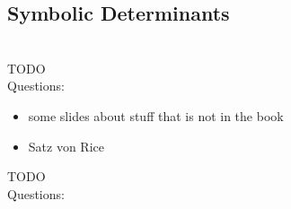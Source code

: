 \documentclass[a4]{scrartcl}
\begin{document}
















\subsection*{Symbolic Determinants}



\ \\

\color{red} TODO \\
\color{black}
\color{violet} Questions: \\
\color{black}






\begin{itemize}
\item some slides about stuff that is not in the book
\item Satz von Rice
\end{itemize}


\color{red} TODO \\
\color{black}
\color{violet} Questions: \\
\color{black}



\newpage

\printbibliography
\end{document}
